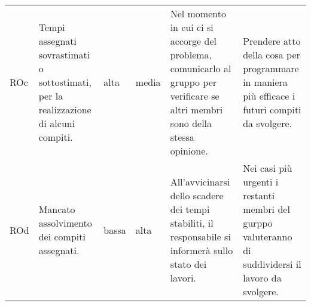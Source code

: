 {\begin{longtable}{|p{1cm}|p{3cm}|p{1cm}|p{1cm}|p{3cm}|p{3cm}|}
        ROc &
        Tempi assegnati sovrastimati o sottostimati, per la realizzazione di alcuni compiti. &
        alta &
        media &
        Nel momento in cui ci si accorge del problema, comunicarlo al gruppo per verificare se altri membri sono della stessa opinione. &
        Prendere atto della cosa per programmare in maniera più efficace i futuri compiti da svolgere. \\

        ROd &
        Mancato assolvimento dei compiti assegnati. &
        bassa &
        alta &
        All'avvicinarsi dello scadere dei tempi stabiliti, il responsabile si informerà sullo stato dei lavori. &
        Nei casi più urgenti i restanti membri del gurppo valuteranno di suddividersi il lavoro da svolgere. \\
       
    \end{longtable}
    }
        
